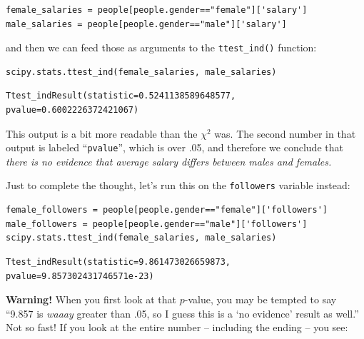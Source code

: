 \begin{Verbatim}[fontsize=\small,samepage=true,frame=single,framesep=3mm]
female_salaries = people[people.gender=="female"]['salary']
male_salaries = people[people.gender=="male"]['salary']
\end{Verbatim}
\vspace{-.2in}


and then we can feed those as arguments to the \texttt{ttest\_ind()} function:

\begin{Verbatim}[fontsize=\small,samepage=true,frame=single,framesep=3mm]
scipy.stats.ttest_ind(female_salaries, male_salaries)
\end{Verbatim}
\vspace{-.2in}

\begin{Verbatim}[fontsize=\small,samepage=true,frame=leftline,framesep=5mm,framerule=1mm]
Ttest_indResult(statistic=0.5241138589648577, pvalue=0.6002226372421067)
\end{Verbatim}

This output is a bit more readable than the $\chi^2$ was. The second number in
that output is labeled ``\texttt{pvalue}'', which is over .05, and therefore we
conclude that \textit{there is no evidence that average salary differs between
males and females.}

Just to complete the thought, let's run this on the \texttt{followers} variable
instead:

\begin{Verbatim}[fontsize=\small,samepage=true,frame=single,framesep=3mm]
female_followers = people[people.gender=="female"]['followers']
male_followers = people[people.gender=="male"]['followers']
scipy.stats.ttest_ind(female_salaries, male_salaries)
\end{Verbatim}
\vspace{-.2in}

\begin{Verbatim}[fontsize=\small,samepage=true,frame=leftline,framesep=5mm,framerule=1mm]
Ttest_indResult(statistic=9.861473026659873, pvalue=9.857302431746571e-23)
\end{Verbatim}

\textbf{Warning!} When you first look at that $p$-value, you may be tempted to
say ``9.857 is \textit{waaay} greater than .05, so I guess this is a `no
evidence' result as well.'' Not so fast! If you look at the entire number --
including the ending -- you see:

